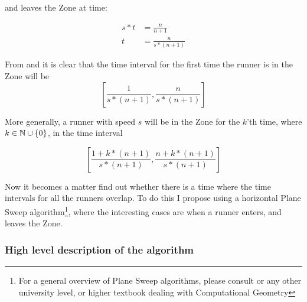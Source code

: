 and leaves the Zone at time:

\begin{equation}
\label{eqa:speedTwo}
\begin{split}
s * t &= \frac{n}{n+1} \\
t &= \frac{n}{s * (n+1)}
\end{split}
\end{equation}

From  and  it is clear that the time interval for the first time the runner is in the Zone will be 
\begin{displaymath}
\left[\frac{1}{s * (n+1)}, \frac{n}{s * (n+1)}\right]
\end{displaymath}

More generally, a runner with speed $s$ will be in the Zone for the $k$'th time, where $k \in \mathbb{N} \cup \{0\}$, in the time interval 

\begin{equation}
\label{eqa:genericZone}
\left[\frac{1 + k * (n+1)}{s * (n+1)}, \frac{n + k * (n+1)}{s * (n+1)}\right] 
\end{equation}

Now it becomes a matter find out whether there is a time where the time intervals for all the runners overlap. To do this I propose using a horizontal Plane Sweep algorithm\footnote{For a general overview of Plane Sweep algorithms, please consult \cite{citeulike:3347056} or any other university level, or higher textbook dealing with Computational Geometry}, where the interesting cases are when a runner enters, and leaves the Zone. 

\subsubsection{High level description of the algorithm}

